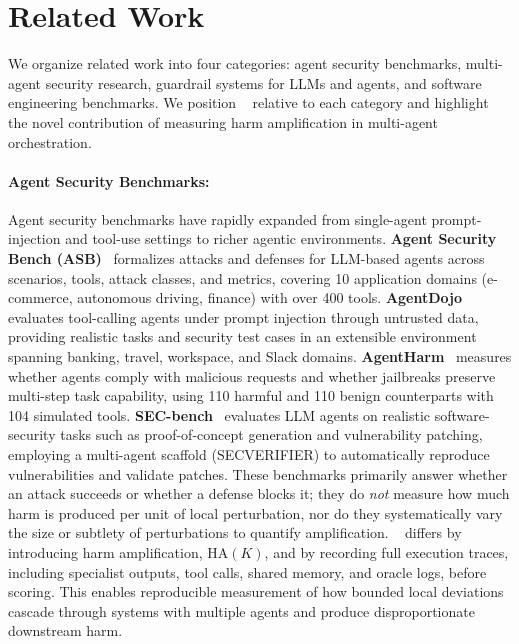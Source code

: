 \section{Related Work}
We organize related work into four categories: agent security benchmarks, multi-agent security research, guardrail systems for LLMs and agents, and software engineering benchmarks. We position \proposed~ relative to each category and highlight the novel contribution of measuring harm amplification in multi-agent orchestration.



\paragraph{Agent Security Benchmarks:}
Agent security benchmarks have rapidly expanded from single-agent prompt-injection and tool-use settings to richer agentic environments. \textbf{Agent Security Bench (ASB)}~\cite{zhang2025agent} formalizes attacks and defenses for LLM-based agents across scenarios, tools, attack classes, and metrics, covering 10 application domains (e-commerce, autonomous driving, finance) with over 400 tools. \textbf{AgentDojo}~\cite{debenedetti2024agentdojo} evaluates tool-calling agents under prompt injection through untrusted data, providing realistic tasks and security test cases in an extensible environment spanning banking, travel, workspace, and Slack domains. \textbf{AgentHarm}~\cite{andriushchenko2025agentharm} measures whether agents comply with malicious requests and whether jailbreaks preserve multi-step task capability, using 110 harmful and 110 benign counterparts with 104 simulated tools. \textbf{SEC-bench}~\cite{lee2026secbench} evaluates LLM agents on realistic software-security tasks such as proof-of-concept generation and vulnerability patching, employing a multi-agent scaffold (SECVERIFIER) to automatically reproduce vulnerabilities and validate patches. These benchmarks primarily answer whether an attack succeeds or whether a defense blocks it; they do \textit{not} measure how much harm is produced per unit of local perturbation, nor do they systematically vary the size or subtlety of perturbations to quantify amplification. \proposed~ differs by introducing harm amplification, $\text{HA}(K)$, and by recording full execution traces, including specialist outputs, tool calls, shared memory, and oracle logs, before scoring. This enables reproducible measurement of how bounded local deviations cascade through systems with multiple agents and produce disproportionate downstream harm.

